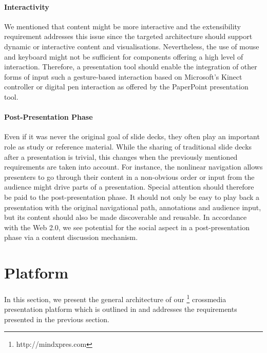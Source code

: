      \paragraph{Interactivity} We mentioned that content might be more
      interactive and the extensibility requirement addresses this issue since
      the targeted architecture should support dynamic or interactive content
      and visualisations. Nevertheless, the use of mouse and keyboard might not
      be sufficient for components offering a high level of interaction.
      Therefore, a presentation tool should enable the integration of other
      forms of input such a gesture-based interaction based on Microsoft's
      Kinect controller or digital pen interaction \citep{signer-2} as offered
      by the PaperPoint \citep{signer-1} presentation tool.

     \paragraph{Post-Presentation Phase} Even if it was never the original goal
      of slide decks, they often play an important role as study or reference
      material. While the sharing of traditional slide decks after a
      presentation is trivial, this changes when the previously mentioned
      requirements are taken into account. For instance, the nonlinear
      navigation allows presenters to go through their content in a non-obvious
      order or input from the audience might drive parts of a presentation.
      Special attention should therefore be paid to the post-presentation
      phase. It should not only be easy to play back a presentation with the
      original navigational path, annotations and audience input, but its
      content should also be made discoverable and reusable. In accordance with
      the Web 2.0, we see potential for the social aspect in a
      post-presentation phase via a content discussion mechanism.

  \section{\mxp Platform}
   \label{mxp-platform}

   In this section, we present the general architecture of our
   \mxp\footnote{http://mindxpres.com} crossmedia presentation platform which
   is outlined in  and addresses the requirements
   presented in the previous section.


